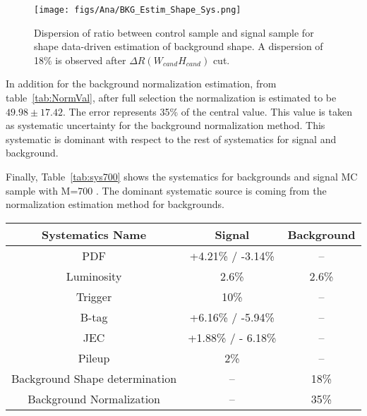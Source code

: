 \begin{figure}[!Hhtbp]
  \begin{center}
    \texttt{[image: figs/Ana/BKG\_Estim\_Shape\_Sys.png]}
    \caption{Dispersion of ratio between control sample and signal sample for shape data-driven estimation of background shape. A dispersion of 18\% is observed after $\Delta R (W_{cand} H_{cand})$ cut.}
    \label{fig:ShapeSys}
  \end{center}
\end{figure}

In addition for the background normalization estimation, from table~\ref{tab:NormVal}, after full selection the normalization is estimated to be $49.98\pm17.42$. The error represents 35\% of the central value. This value is taken as systematic uncertainty for the background normalization method. This systematic is dominant with respect to the rest of systematics for signal and background.

Finally, Table~\ref{tab:sys700} shows the systematics for backgrounds and signal MC sample with M=700 \GeVcc. The dominant systematic source is coming from the normalization estimation method for backgrounds.

\begin{table*}[htbH]
\begin{center}
\begin{tabular}{|c|c|c|}
\hline 
Systematics Name & Signal & Background \\
\hline
PDF & +4.21\% / -3.14\% & --\\
Luminosity & 2.6\% & 2.6\%\\
Trigger & 10\% & --\\
B-tag & +6.16\% / -5.94\% & --\\
JEC & +1.88\% / - 6.18\% & --\\
Pileup & 2\% & --\\
Background Shape determination & -- & 18\%\\
Background Normalization & -- & 35\%\\
\hline
\end{tabular}
\caption{Summary of uncertainties in the case of signal mass point at 700 GeV/$c^{2}$ and for background.\label{tab:sys700}}
\end{center}
\end{table*}

